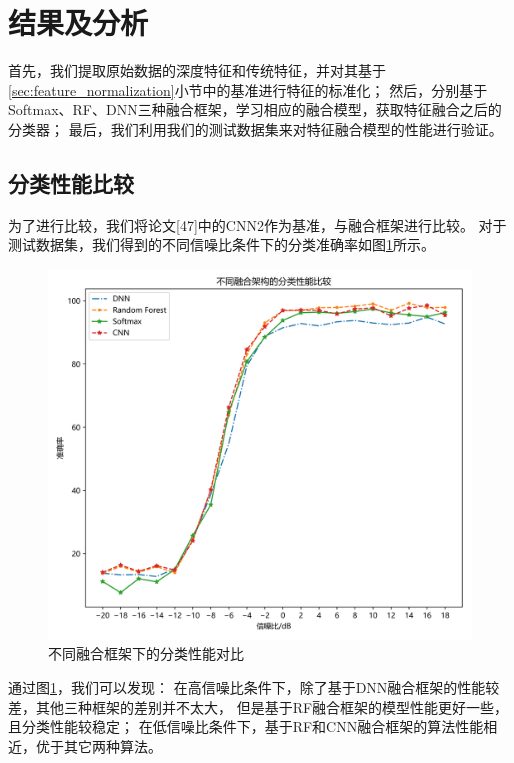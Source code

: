 \section{结果及分析}
首先，我们提取原始数据的深度特征和传统特征，并对其基于\ref{sec:feature_normalization}小节中的基准进行特征的标准化；
然后，分别基于Softmax、RF、DNN三种融合框架，学习相应的融合模型，获取特征融合之后的分类器；
最后，我们利用我们的测试数据集来对特征融合模型的性能进行验证。\par

\subsection{分类性能比较}

为了进行比较，我们将论文[47]中的CNN2作为基准，与融合框架进行比较。
对于测试数据集，我们得到的不同信噪比条件下的分类准确率如图\ref{sec:fig_4_5}所示。\par

\begin{figure}[!h]
	\centering
	\includegraphics[scale=0.6]{figures/chapter_4/fig_4_5}
	\caption{不同融合框架下的分类性能对比}\label{sec:fig_4_5}
\end{figure}

通过图\ref{sec:fig_4_5}，我们可以发现：
在高信噪比条件下，除了基于DNN融合框架的性能较差，其他三种框架的差别并不太大，
但是基于RF融合框架的模型性能更好一些，且分类性能较稳定；
在低信噪比条件下，基于RF和CNN融合框架的算法性能相近，优于其它两种算法。\par

